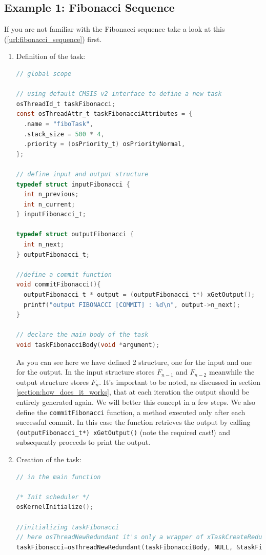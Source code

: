 \documentclass[a4paper, 12pt]{article}
\begin{document}
\begin{onehalfspace}
\subsection{Example 1: Fibonacci Sequence} \label{example:fibo}
If you are not familiar with the Fibonacci sequence take a look at this (\ref{url:fibonacci_sequence}) first.\\
\begin{enumerate}
    \item {
    Definition of the task:
        \begin{lstlisting}[language=C]
// global scope

// using default CMSIS v2 interface to define a new task
osThreadId_t taskFibonacci;
const osThreadAttr_t taskFibonacciAttributes = {
  .name = "fiboTask",
  .stack_size = 500 * 4,
  .priority = (osPriority_t) osPriorityNormal,
};

// define input and output structure
typedef struct inputFibonacci {
  int n_previous;
  int n_current;
} inputFibonacci_t;

typedef struct outputFibonacci {
  int n_next;
} outputFibonacci_t;

//define a commit function
void commitFibonacci(){
  outputFibonacci_t * output = (outputFibonacci_t*) xGetOutput();
  printf("output FIBONACCI [COMMIT] : %d\n", output->n_next);
}

// declare the main body of the task
void taskFibonacciBody(void *argument);
        \end{lstlisting}
        As you can see here we have defined 2 structure, one for the input and one for the output.
        In the input structure stores $F_{n-1}$ and $F_{n-2}$ meanwhile the output structure stores $F_n$. It's important to be noted, as discussed in section \ref{section:how_does_it_works}, that at each iteration the output should be entirely generated again. We will better this concept in a few steps. We also define the \texttt{commitFibonacci} function, a method executed only after each successful commit. In this case the function retrieves the output by calling \texttt{(outputFibonacci\_t*) xGetOutput()} (note the required cast!) and subsequently proceeds to print the output.
    }
    \item {
    Creation of the task:
    \begin{lstlisting}[language=C]
// in the main function

/* Init scheduler */
osKernelInitialize();
  
//initializing taskFibonacci
// here osThreadNewRedundant it's only a wrapper of xTaskCreateRedundant, code available on References and Material
taskFibonacci=osThreadNewRedundant(taskFibonacciBody, NULL, &taskFibonacciAttributes);


\end{lstlisting}}
\end{enumerate}
\end{onehalfspace}
\end{document}
